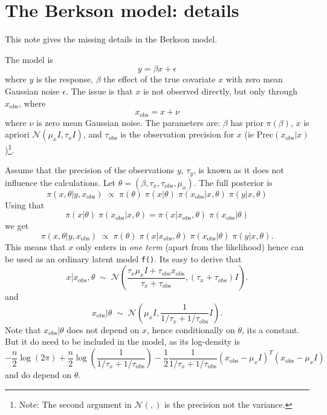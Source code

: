 \documentclass[a4paper,11pt]{article}
\def\o{_{\text{obs}}}
\begin{document}
\section*{The Berkson model: details}

This note gives the missing details in the Berkson model.

The model is
\begin{displaymath}
    y = \beta x + \epsilon{}
\end{displaymath}
where $y$ is the response, $\beta$ the effect of the true covariate
$x$ with zero mean Gaussian noise $\epsilon$. The issue is that $x$ is
not observed directly, but only through $x_{\text{obs}}$, where
\begin{displaymath}
    x\o = x + \nu{}
\end{displaymath}
where $\nu$ is zero mean Gaussian noise.  The parameters are: $\beta$
has prior $\pi(\beta)$, $x$ is apriori ${\mathcal N}(\mu_{x} {I},
\tau_{x} {I})$, and $\tau\o$ is the observation precision for $x$ (ie
$\text{Prec}(x\o|x)$)\footnote{Note: The second argument in ${\mathcal
        N}(,)$ is the precision not the variance.}.

Assume that the precision of the observations $y$, $\tau_{y}$, is
known as it does not influence the calculations. Let $\theta =
(\beta, \tau_{x}, \tau\o, \mu_{x})$.  The full posterior is
\begin{displaymath}
    \pi(x, \theta | y, x\o) \;\propto\; \pi(\theta)
    \; \pi(x |\theta) \; \pi(x\o | x, \theta) \;
    \pi(y | x, \theta)
\end{displaymath}
Using that
\begin{displaymath}
    \pi(x | \theta) \; \pi(x\o | x, \theta) = 
    \pi(x | x\o, \theta) \; \pi(x\o | \theta)
\end{displaymath}
we get
\begin{displaymath}
    \pi(x, \theta | y, x\o) \;\propto\; \pi(\theta)\; 
    \pi(x | x\o, \theta) \; \pi(x\o | \theta) \;
    \pi(y | x, \theta).
\end{displaymath}
This means that $x$ only enters in \emph{one term} (apart from the
likelihood) hence can be used as an ordinary latent model
\texttt{f()}. Its easy to derive that
\begin{displaymath}
    x | x\o, \theta \;\sim\;{\mathcal N}\left(
      \frac{\tau_{x} \mu_{x} I + \tau\o x\o}{
          \tau_{x}+\tau\o}, 
      ({\tau_{x} + \tau\o}) I \right).
\end{displaymath}
and 
\begin{displaymath}
    x\o | \theta \;\sim\; {\mathcal N}\left(
      \mu_{x}I, \frac{1}{1/\tau_{x} + 1/\tau\o} I\right).
\end{displaymath}
Note that $x\o | \theta$ does not depend on $x$, hence conditionally
on $\theta$, its a constant. But it do need to be included in the
model, as its log-density is
\begin{displaymath}
    -\frac{n}{2}\log(2\pi) + \frac{n}{2} \log(\frac{1}{1/\tau_{x} +
        1/\tau\o})
    - \frac{1}{2} \frac{1}{1/\tau_{x} + 1/\tau\o} (x\o -\mu_{x}
    I)^{T}(x\o -\mu_{x}I)
\end{displaymath}
and do depend on $\theta$.
\end{document}
